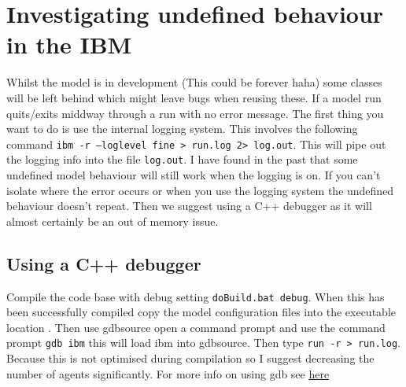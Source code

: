 \section{Investigating undefined behaviour in the IBM\label{sec:debugging}}

Whilst the model is in development (This could be forever haha) some classes will be left behind which might leave bugs when reusing these. If a model run quits/exits middway through a run with no error message. The first thing you want to do is use the internal logging system. This involves the following command \texttt{ibm -r --loglevel fine > run.log 2> log.out}. This will pipe out the logging info into the file \texttt{log.out}. I have found in the past that some undefined model behaviour will still work when the logging is on. If you can't isolate where the error occurs or when you use the logging system the undefined behaviour doesn't repeat. Then we suggest using a C++ debugger as it will almost certainly be an out of memory issue. 


\subsection{Using a C++ debugger}
Compile the code base with debug setting \texttt{doBuild.bat debug}. When this has been successfully compiled copy the model configuration files into the executable location . Then use gdbsource open a command prompt and use the command prompt \texttt{gdb ibm} this will load ibm into gdbsource. Then type \texttt{run -r > run.log}. Because this is not optimised during compilation so I suggest decreasing the number of agents significantly. For more info on using gdb see \href{https://www.gnu.org/software/gdb/}{here}




